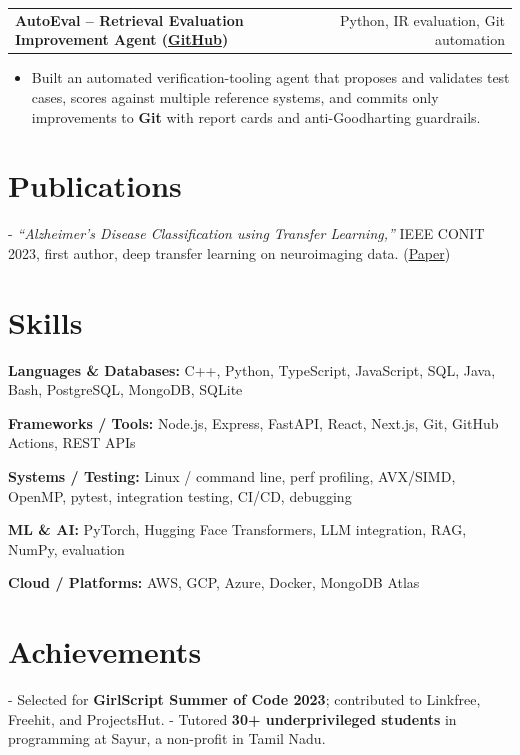 \documentclass[letterpaper,11pt]{article}
\makeatletter
\newcommand{\projItem}[2]{%
  \vspace{6pt}
  \begin{tabular*}{\textwidth}{@{}l@{\extracolsep{\fill}}r@{}}
    \textbf{#1} & #2 \\
  \end{tabular*}\par\vspace{-2pt}
}
\newcommand{\skillLine}[2]{\textbf{#1:} #2\par\vspace{2pt}}
\newcommand{\inlineBlock}[1]{{\setlength{\leftskip}{0.18in}\small #1\par}}
\makeatother
\begin{document}
\projItem{AutoEval -- Retrieval Evaluation Improvement Agent {\normalfont\small(\href{https://github.com/Deva-1903/AutoEval}{GitHub})}}{Python, IR evaluation, Git automation}
\begin{itemize}
  \item Built an automated verification-tooling agent that proposes and validates test cases, scores against multiple reference systems, and commits only improvements to \textbf{Git} with report cards and anti-Goodharting guardrails.
\end{itemize}

\section{Publications}
\inlineBlock{- \textit{``Alzheimer's Disease Classification using Transfer Learning,''} IEEE CONIT 2023, first author, deep transfer learning on neuroimaging data. {\normalfont\small(\href{https://ieeexplore.ieee.org/document/10205760}{Paper})}}

\section{Skills}
\skillLine{Languages \& Databases}{C++, Python, TypeScript, JavaScript, SQL, Java, Bash, PostgreSQL, MongoDB, SQLite}
\skillLine{Frameworks / Tools}{Node.js, Express, FastAPI, React, Next.js, Git, GitHub Actions, REST APIs}
\skillLine{Systems / Testing}{Linux / command line, perf profiling, AVX/SIMD, OpenMP, pytest, integration testing, CI/CD, debugging}
\skillLine{ML \& AI}{PyTorch, Hugging Face Transformers, LLM integration, RAG, NumPy, evaluation}
\skillLine{Cloud / Platforms}{AWS, GCP, Azure, Docker, MongoDB Atlas}

\section{Achievements}
\inlineBlock{- Selected for \textbf{GirlScript Summer of Code 2023}; contributed to Linkfree, Freehit, and ProjectsHut. - Tutored \textbf{30+ underprivileged students} in programming at Sayur, a non-profit in Tamil Nadu.}
\end{document}
